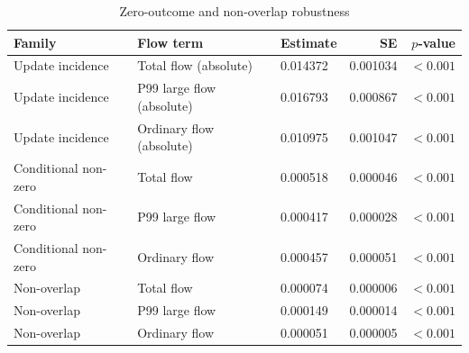 \begin{table}[htbp]
\centering
\caption{Zero-outcome and non-overlap robustness}
\label{tab:appendix-zero}
\footnotesize
\begin{tabular}{lllrr}
\hline
Family & Flow term & Estimate & SE & $p$-value \\
\hline
Update incidence & Total flow (absolute) & 0.014372 & 0.001034 & $<0.001$ \\
Update incidence & P99 large flow (absolute) & 0.016793 & 0.000867 & $<0.001$ \\
Update incidence & Ordinary flow (absolute) & 0.010975 & 0.001047 & $<0.001$ \\
Conditional non-zero & Total flow & 0.000518 & 0.000046 & $<0.001$ \\
Conditional non-zero & P99 large flow & 0.000417 & 0.000028 & $<0.001$ \\
Conditional non-zero & Ordinary flow & 0.000457 & 0.000051 & $<0.001$ \\
Non-overlap & Total flow & 0.000074 & 0.000006 & $<0.001$ \\
Non-overlap & P99 large flow & 0.000149 & 0.000014 & $<0.001$ \\
Non-overlap & Ordinary flow & 0.000051 & 0.000005 & $<0.001$ \\
\hline
\end{tabular}
\end{table}
